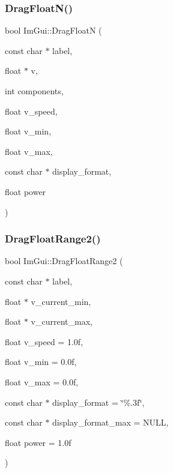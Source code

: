 \hypertarget{namespace_im_gui_a2a2764b6f0b3291ad0df4d99127dd751}{}\label{namespace_im_gui_a2a2764b6f0b3291ad0df4d99127dd751} 
\subsubsection{\texorpdfstring{Drag\+Float\+N()}{DragFloatN()}}
{\footnotesize\ttfamily bool Im\+Gui\+::\+Drag\+FloatN (\begin{DoxyParamCaption}\item[{const char $\ast$}]{label,  }\item[{float $\ast$}]{v,  }\item[{int}]{components,  }\item[{float}]{v\+\_\+speed,  }\item[{float}]{v\+\_\+min,  }\item[{float}]{v\+\_\+max,  }\item[{const char $\ast$}]{display\+\_\+format,  }\item[{float}]{power }\end{DoxyParamCaption})}

\hypertarget{namespace_im_gui_ad6e3b0e5a2171679c53d6b18e16a460b}{}\label{namespace_im_gui_ad6e3b0e5a2171679c53d6b18e16a460b} 
\subsubsection{\texorpdfstring{Drag\+Float\+Range2()}{DragFloatRange2()}}
{\footnotesize\ttfamily bool Im\+Gui\+::\+Drag\+Float\+Range2 (\begin{DoxyParamCaption}\item[{const char $\ast$}]{label,  }\item[{float $\ast$}]{v\+\_\+current\+\_\+min,  }\item[{float $\ast$}]{v\+\_\+current\+\_\+max,  }\item[{float}]{v\+\_\+speed = {\ttfamily 1.0f},  }\item[{float}]{v\+\_\+min = {\ttfamily 0.0f},  }\item[{float}]{v\+\_\+max = {\ttfamily 0.0f},  }\item[{const char $\ast$}]{display\+\_\+format = {\ttfamily \char`\"{}\%.3f\char`\"{}},  }\item[{const char $\ast$}]{display\+\_\+format\+\_\+max = {\ttfamily NULL},  }\item[{float}]{power = {\ttfamily 1.0f} }\end{DoxyParamCaption})}

